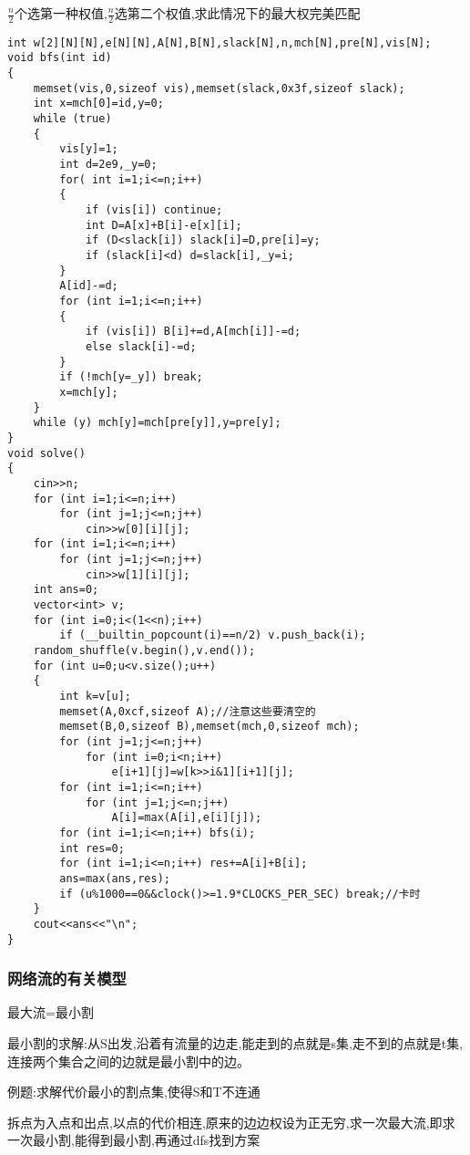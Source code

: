 \documentclass[a4paper]{ctexart}
\begin{document}
$\frac{n}{2}$个选第一种权值,$\frac{n}{2}$选第二个权值,求此情况下的最大权完美匹配

\begin{lstlisting}
int w[2][N][N],e[N][N],A[N],B[N],slack[N],n,mch[N],pre[N],vis[N];
void bfs(int id)
{
    memset(vis,0,sizeof vis),memset(slack,0x3f,sizeof slack);
    int x=mch[0]=id,y=0;
    while (true)
    {
        vis[y]=1;
        int d=2e9,_y=0;
        for( int i=1;i<=n;i++)
        {
            if (vis[i]) continue;
            int D=A[x]+B[i]-e[x][i];
            if (D<slack[i]) slack[i]=D,pre[i]=y;
            if (slack[i]<d) d=slack[i],_y=i;
        }
        A[id]-=d;
        for (int i=1;i<=n;i++)
        {
            if (vis[i]) B[i]+=d,A[mch[i]]-=d;
            else slack[i]-=d;
        }
        if (!mch[y=_y]) break;
        x=mch[y];
    }
    while (y) mch[y]=mch[pre[y]],y=pre[y];
}
void solve()
{
    cin>>n;
    for (int i=1;i<=n;i++)
        for (int j=1;j<=n;j++)
            cin>>w[0][i][j];
    for (int i=1;i<=n;i++)
        for (int j=1;j<=n;j++)
            cin>>w[1][i][j];
    int ans=0;
    vector<int> v;
    for (int i=0;i<(1<<n);i++) 
        if (__builtin_popcount(i)==n/2) v.push_back(i);
    random_shuffle(v.begin(),v.end());
    for (int u=0;u<v.size();u++)
    {
        int k=v[u];
        memset(A,0xcf,sizeof A);//注意这些要清空的
        memset(B,0,sizeof B),memset(mch,0,sizeof mch);
        for (int j=1;j<=n;j++)
            for (int i=0;i<n;i++)
                e[i+1][j]=w[k>>i&1][i+1][j];
        for (int i=1;i<=n;i++)
            for (int j=1;j<=n;j++)
                A[i]=max(A[i],e[i][j]);
        for (int i=1;i<=n;i++) bfs(i);
        int res=0;
        for (int i=1;i<=n;i++) res+=A[i]+B[i];
        ans=max(ans,res);
        if (u%1000==0&&clock()>=1.9*CLOCKS_PER_SEC) break;//卡时
    }
    cout<<ans<<"\n";
}
\end{lstlisting}

\subsubsection{网络流的有关模型}

最大流=最小割

最小割的求解:从S出发,沿着有流量的边走,能走到的点就是s集,走不到的点就是t集,连接两个集合之间的边就是最小割中的边。

例题:求解代价最小的割点集,使得S和T不连通

拆点为入点和出点,以点的代价相连,原来的边边权设为正无穷,求一次最大流,即求一次最小割,能得到最小割,再通过dfs找到方案
\end{document}
